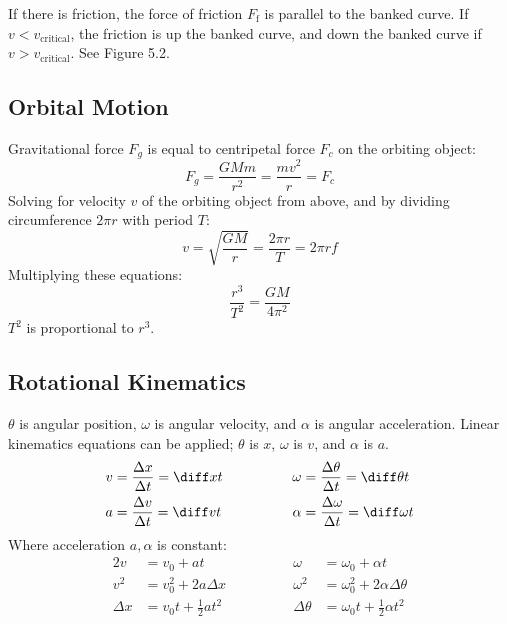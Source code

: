 \documentclass{article}
\newcommand{\theorem}[2]{\begin{tcolorbox}[title={#1},colback=blue!5!white,colframe=blue!75!black,parbox=false] #2 \end{tcolorbox}}
\begin{document}
If there is friction, the force of friction $F_ \text{f}$ is parallel to the banked curve. If $v<v_ \text{critical}$, the friction is up the banked curve, and down the banked curve if $v> v_ \text{critical}$. See Figure 5.2.

\subsection{Orbital Motion}

Gravitational force $F_g$ is equal to centripetal force $F_c$ on the orbiting object:
\begin{equation*}
    F_g
	=\frac{GMm}{r^2}
    =\frac{mv^2}{r}
	=F_c
\end{equation*}
Solving for velocity $v$ of the orbiting object from above, and by dividing circumference $2\pi r$ with period $T$:
\begin{equation*}
	v=\sqrt{\frac{GM}{r}}
	=\frac{2\pi r}{T}
	=2\pi r f
\end{equation*}
Multiplying these equations:
\begin{equation*}
    \frac{r^3}{T^2}
	=\frac{GM}{4\pi^2}
\end{equation*}
$T^2$ is proportional to $r^3$.

\subsection{Rotational Kinematics}

\theorem{Rotational kinematics basics}{$\theta$ is angular position, $\omega$ is angular velocity, and $\alpha$ is angular acceleration. Linear kinematics equations can be applied; $\theta$ is $x$, $\omega$ is $v$, and $\alpha$ is $a$.
\begin{alignat*}{2}
	v
	&=\frac{\Delta x}{\Delta t}=\diff xt
	&\qquad\qquad
	\omega
	&=\frac{\Delta \theta}{\Delta t}=\diff \theta t \\
	a
	&=\frac{\Delta v}{\Delta t}=\diff vt
	&\qquad\qquad
	\alpha
	&=\frac{\Delta \omega}{\Delta t}=\diff \omega t
\end{alignat*}
Where acceleration $a,\alpha$ is constant:
\begin{alignat*}{2}
	v 
	&=v_0+at
	&\qquad\qquad
	\omega 
	&=\omega_0+\alpha t \\
	v^2
	&=v_0^2+2a\Delta x
	&\qquad\qquad
	\omega^2
	&=\omega_0^2+2\alpha \Delta \theta \\
	\Delta x
	&=v_0t+\frac12at^2
	&\qquad\qquad
	\Delta \theta
	&=\omega_0t +\frac12\alpha t^2
\end{alignat*}
}
\end{document}
